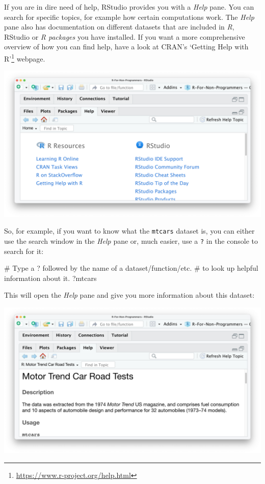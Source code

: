\documentclass[
  letterpaper,
]{krantz}
\makeatletter
\newenvironment{Shaded}{\begin{snugshade}}{\end{snugshade}}
\newcommand{\CommentTok}[1]{\textcolor[rgb]{0.37,0.37,0.37}{#1}}
\newcommand{\NormalTok}[1]{\textcolor[rgb]{0.00,0.23,0.31}{#1}}
\renewcommand{\href}[2]{#2\footnote{\url{#1}}}
\newenvironment{kframe}{%
\medskip{}
\setlength{\fboxsep}{.8em}
 \def\at@end@of@kframe{}%
 \ifinner\ifhmode%
  \def\at@end@of@kframe{\end{minipage}}%
  \begin{minipage}{\columnwidth}%
 \fi\fi%
 \def\FrameCommand##1{\hskip\@totalleftmargin \hskip-\fboxsep
 \colorbox{shadecolor}{##1}\hskip-\fboxsep
     \hskip-\linewidth \hskip-\@totalleftmargin \hskip\columnwidth}%
 \MakeFramed {\advance\hsize-\width
   \@totalleftmargin\z@ \linewidth\hsize
   \@setminipage}}%
 {\par\unskip\endMakeFramed%
 \at@end@of@kframe}
\renewenvironment{Shaded}{\begin{kframe}}{\end{kframe}}
\makeatother
\begin{document}
If you are in dire need of help, RStudio provides you with a \emph{Help}
pane. You can search for specific topics, for example how certain
computations work. The \emph{Help} pane also has documentation on
different datasets that are included in \emph{R}, RStudio or \emph{R
packages} you have installed. If you want a more comprehensive overview
of how you can find help, have a look at CRAN's
\href{https://www.r-project.org/help.html}{`Getting Help with R'}
webpage.

\includegraphics{images/chapter_04_img/05_files_plots_etc/04_rstudio_help.png}

So, for example, if you want to know what the \texttt{mtcars} dataset
is, you can either use the search window in the \emph{Help} pane or,
much easier, use a \texttt{?} in the console to search for it:

\begin{Shaded}
\begin{Highlighting}[]
\CommentTok{\# Type a \textquotesingle{}?\textquotesingle{} followed by the name of a dataset/function/etc.}
\CommentTok{\# to look up helpful information about it.}
\NormalTok{?mtcars}
\end{Highlighting}
\end{Shaded}

This will open the \emph{Help} pane and give you more information about
this dataset:

\includegraphics{images/chapter_04_img/05_files_plots_etc/04_rstudio_help_mtcars.png}
\end{document}
